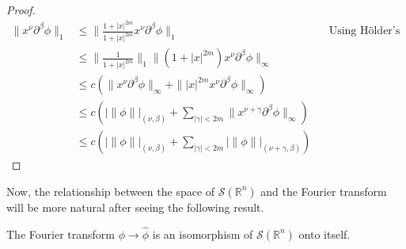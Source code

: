 \begin{proof}{}
	\begin{align*}
		\|x^{\nu}\partial^{\beta}\phi\|_{1}&\leq \|\frac{1+|x|^{2m}}{1+|x|^{2m}}x^{\nu}\partial^{\beta}\phi\|_{1} &&\text{Using Hölder's inequality.}\\
		&\leq \|\frac{1}{1+|x|^{2m}}\|_{1}\|(1+|x|^{2m})x^{\nu}\partial^{\beta}\phi\|_{\infty}\\
		&\leq c(\|x^{\nu}\partial^{\beta}\phi\|_{\infty}+\||x|^{2m}x^{\nu}\partial^{\beta}\phi\|_{\infty})\\
		&\leq c(|\|\phi\||_{(\nu,\beta)}+\sum_{|\gamma|<2m}\|x^{\nu+\gamma}\partial^{\beta}\phi\|_{\infty})\\
		&\leq c(|\|\phi\||_{(\nu,\beta)}+\sum_{|\gamma|<2m}|\|\phi\||_{(\nu+\gamma,\beta)})
	\end{align*}
\end{proof}
Now, the relationship between the space of $\mathcal{S}(\mathbb{R}^n)$ and the Fourier transform will be more natural after seeing the following result.
\begin{theorem}{}
	The Fourier transform $\phi\rightarrow \hat{\phi}$ is an isomorphism of $\mathcal{S}(\mathbb{R}^n)$ onto itself.
\end{theorem}
